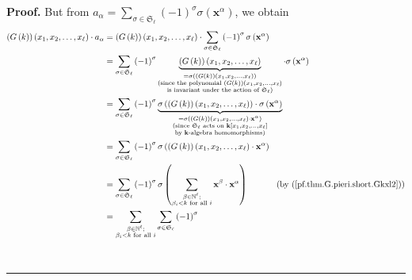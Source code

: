 \documentclass[numbers=enddot,12pt,final,onecolumn,notitlepage]{scrartcl}%
\theoremstyle{definition}
\newenvironment{proof}[1][Proof]{\noindent\textbf{#1.} }{\ \rule{0.5em}{0.5em}}
\let\sumnonlimits\sum
\renewcommand{\sum}{\sumnonlimits\limits}
\newenvironment{vershort}{}{}
\begin{document}
\begin{vershort}
\begin{proof}
But from $a_{\alpha}=\sum_{\sigma\in\mathfrak{S}_{\ell}}\left(  -1\right)
^{\sigma}\sigma\left(  \mathbf{x}^{\alpha}\right)  $, we obtain%
\begin{align}
\left(  G\left(  k\right)  \right)  \left(  x_{1},x_{2},\ldots,x_{\ell
}\right)  \cdot a_{\alpha}  &  =\left(  G\left(  k\right)  \right)  \left(
x_{1},x_{2},\ldots,x_{\ell}\right)  \cdot\sum_{\sigma\in\mathfrak{S}_{\ell}%
}\left(  -1\right)  ^{\sigma}\sigma\left(  \mathbf{x}^{\alpha}\right)
\nonumber\\
&  =\sum_{\sigma\in\mathfrak{S}_{\ell}}\left(  -1\right)  ^{\sigma
}\underbrace{\left(  G\left(  k\right)  \right)  \left(  x_{1},x_{2}%
,\ldots,x_{\ell}\right)  }_{\substack{=\sigma\left(  \left(  G\left(
k\right)  \right)  \left(  x_{1},x_{2},\ldots,x_{\ell}\right)  \right)
\\\text{(since the polynomial }\left(  G\left(  k\right)  \right)  \left(
x_{1},x_{2},\ldots,x_{\ell}\right)  \\\text{is invariant under the action of
}\mathfrak{S}_{\ell}\text{)}}}\cdot\sigma\left(  \mathbf{x}^{\alpha}\right)
\nonumber\\
&  =\sum_{\sigma\in\mathfrak{S}_{\ell}}\left(  -1\right)  ^{\sigma
}\underbrace{\sigma\left(  \left(  G\left(  k\right)  \right)  \left(
x_{1},x_{2},\ldots,x_{\ell}\right)  \right)  \cdot\sigma\left(  \mathbf{x}%
^{\alpha}\right)  }_{\substack{=\sigma\left(  \left(  G\left(  k\right)
\right)  \left(  x_{1},x_{2},\ldots,x_{\ell}\right)  \cdot\mathbf{x}^{\alpha
}\right)  \\\text{(since }\mathfrak{S}_{\ell}\text{ acts on }\mathbf{k}\left[
x_{1},x_{2},\ldots,x_{\ell}\right]  \\\text{by }\mathbf{k}\text{-algebra
homomorphisms)}}}\nonumber\\
&  =\sum_{\sigma\in\mathfrak{S}_{\ell}}\left(  -1\right)  ^{\sigma}%
\sigma\left(  \left(  G\left(  k\right)  \right)  \left(  x_{1},x_{2}%
,\ldots,x_{\ell}\right)  \cdot\mathbf{x}^{\alpha}\right) \nonumber\\
&  =\sum_{\sigma\in\mathfrak{S}_{\ell}}\left(  -1\right)  ^{\sigma}%
\sigma\left(  \sum_{\substack{\beta\in\mathbb{N}^{\ell};\\\beta_{i}<k\text{
for all }i}}\mathbf{x}^{\beta}\cdot\mathbf{x}^{\alpha}\right)
\ \ \ \ \ \ \ \ \ \ \left(  \text{by (\ref{pf.thm.G.pieri.short.Gkxl2}%
)}\right) \nonumber\\
&  =\sum_{\substack{\beta\in\mathbb{N}^{\ell};\\\beta_{i}<k\text{ for all }%
i}}\sum_{\sigma\in\mathfrak{S}_{\ell}}\left(  -1\right)  ^{\sigma}%

\end{align}
\end{proof}
\end{vershort}
\end{document}

